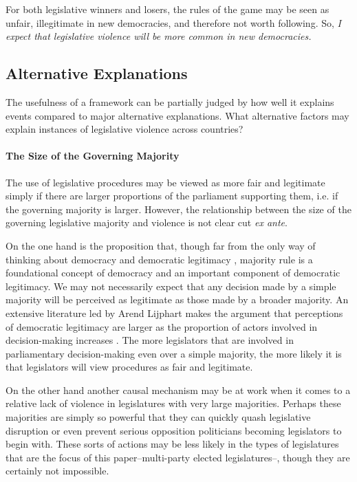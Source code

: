\documentclass[a4paper]{article}\usepackage{graphicx, color}
\begin{document}
For both legislative winners and losers, the rules of the game may be seen as unfair, illegitimate in new democracies, and therefore not worth following. So, \emph{I expect that legislative violence will be more common in new democracies.}

\subsection{Alternative Explanations}

The usefulness of a framework can be partially judged by how well it explains events compared to major alternative explanations. What alternative factors may explain instances of legislative violence across countries?

\paragraph{The Size of the Governing Majority}

The use of legislative procedures may be viewed as more fair and legitimate simply if there are larger proportions of the parliament supporting them, i.e. if the governing majority is larger. However, the relationship between the size of the governing legislative majority and violence is not clear cut \emph{ex ante}. 

On the one hand is the proposition that, though far from the only way of thinking about democracy and democratic legitimacy \cite[see][for a discussion]{Follesdal2006}, majority rule is a foundational concept of democracy \cite{Dahl1989} and an important component of democratic legitimacy. We may not necessarily expect that any decision made by a simple majority will be perceived as legitimate as those made by a broader majority. An extensive literature led by Arend Lijphart makes the argument that perceptions of democratic legitimacy are larger as the proportion of actors involved in decision-making increases \citep[see][]{Lijphart2007}. The more legislators that are involved in parliamentary decision-making even over a simple majority, the more likely it is that legislators will view procedures as fair and legitimate. 

On the other hand another causal mechanism may be at work when it comes to a relative lack of violence in legislatures with very large majorities. Perhaps these majorities are simply so powerful that they can quickly quash legislative disruption or even prevent serious opposition politicians becoming legislators to begin with. These sorts of actions may be less likely in the types of legislatures that are the focus of this paper--multi-party elected legislatures--, though they are certainly not impossible. 
\end{document}

